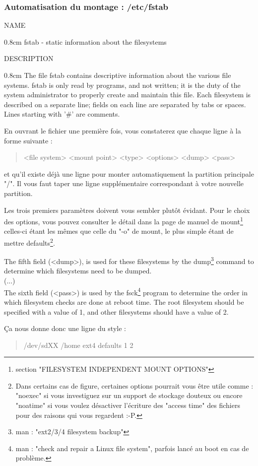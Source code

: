 \documentclass[a4paper]{article}
\newcommand{\commande}[1] {
    \begin{quote}
    \tt\raggedright #1 
    \end{quote}
}
\newcommand{\man}[2]{
    \begin{tcolorbox}[toprule=3mm,width=\textwidth,outer arc=0mm,colbacktitle=grayman,coltitle=black,colback={grayman},colframe={grayman},title={man : \tt #1}]
        \tt\raggedright #2
    \end{tcolorbox}
}
\newcommand{\mandesc}[1]{
    \begin{adjustwidth}{0.8cm}{}
        #1
    \end{adjustwidth}
}
\begin{document}
\subsubsection{Automatisation du montage : /etc/fstab}
\man{fstab}{NAME
\mandesc{fstab - static information about the filesystems}
DESCRIPTION
\mandesc{The  file  fstab  contains descriptive information about the various file systems.  fstab is only read by programs, and not written; it is the duty of the system administrator to properly create and maintain this file.  Each filesystem is described on a separate line; fields on each line are separated by tabs or spaces.  Lines starting with '\#' are comments. }}
\par En ouvrant le fichier une première fois, vous constaterez que chaque ligne à la forme suivante :
\commande{<file system> <mount point> <type> <options> <dump> <pass>}
et qu'il existe déjà une ligne pour monter automatiquement la partition principale "/". Il vous faut taper une ligne supplémentaire correspondant à votre nouvelle partition.
\par Les trois premiers paramètres doivent vous sembler plutôt évidant. Pour le choix des options, vous pouvez consulter le détail dans la page de manuel de mount\footnote{section "FILESYSTEM INDEPENDENT MOUNT OPTIONS"} celles-ci étant les mêmes que celle du "-o" de mount, le plus simple étant de mettre defaults\footnote{Dans certains cas de figure, certaines options pourrait vous être utile comme : "noexec" si vous investiguez sur un support de stockage douteux ou encore "noatime" si vous voulez désactiver l'écriture des "access time" des fichiers pour des raisons qui vous regardent :-P.}.
\man{fstab}{
The fifth field (<dump>), is used for these filesystems by the dump\footnote{man : "ext2/3/4 filesystem backup"} command to determine which filesystems need to be dumped.\\
(...)\\
The sixth field (<pass>) is used by the fsck\footnote{man : "check and repair a Linux file system", parfois lancé au boot en cas de problème.} program to determine the order in which filesystem checks are done at reboot time. The root filesystem should be specified with a value of 1, and other filesystems should have a value of 2.
}
\par Ça nous donne donc une ligne du style :
\commande{/dev/sdXX /home ext4 defaults 1 2}
\end{document}
